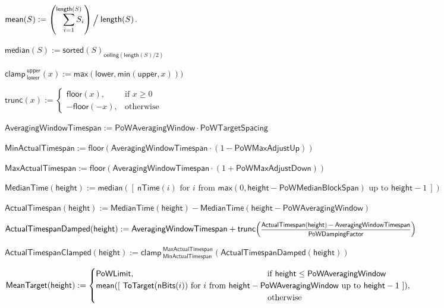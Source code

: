 \documentclass{article}
\newcommand{\hfrac}[2]{\scalebox{0.8}{$\genfrac{}{}{0.5pt}{0}{#1}{#2}$}}
\newcommand{\listcomp}[1]{[~{#1}~]}
\newcommand{\for}{\text{ for }}
\newcommand{\from}{\text{ from }}
\newcommand{\upto}{\text{ up to }}
\newcommand{\squash}{\!\!\!}
\newcommand{\caseif}{\squash\text{if }}
\newcommand{\caseotherwise}{\squash\text{otherwise}}
\newcommand{\sorted}{\mathsf{sorted}}
\newcommand{\length}{\mathsf{length}}
\newcommand{\mean}{\mathsf{mean}}
\newcommand{\median}{\mathsf{median}}
\newcommand{\clamp}[2]{\mathsf{clamp\,}_{#1}^{#2}}
\newcommand{\Lower}{\mathsf{lower}}
\newcommand{\Upper}{\mathsf{upper}}
\newcommand{\ToTarget}{\mathsf{ToTarget}}
\newcommand{\minimum}{\mathsf{min}}
\newcommand{\maximum}{\mathsf{max}}
\newcommand{\floor}[1]{\mathsf{floor}\!\left({#1}\right)}
\newcommand{\trunc}[1]{\mathsf{trunc}\!\left({#1}\right)}
\newcommand{\ceiling}[1]{\mathsf{ceiling}\left({#1}\right)}
\newcommand{\vsum}[2]{\smashoperator[r]{\sum_{#1}^{#2}}}
\newcommand{\mult}{\cdot}
\newcommand{\BlockHeight}{\mathsf{height}}
\newcommand{\PoWLimit}{\mathsf{PoWLimit}}
\newcommand{\PoWAveragingWindow}{\mathsf{PoWAveragingWindow}}
\newcommand{\PoWMedianBlockSpan}{\mathsf{PoWMedianBlockSpan}}
\newcommand{\PoWMaxAdjustDown}{\mathsf{PoWMaxAdjustDown}}
\newcommand{\PoWMaxAdjustUp}{\mathsf{PoWMaxAdjustUp}}
\newcommand{\PoWDampingFactor}{\mathsf{PoWDampingFactor}}
\newcommand{\PoWTargetSpacing}{\mathsf{PoWTargetSpacing}}
\newcommand{\MeanTarget}{\mathsf{MeanTarget}}
\newcommand{\MedianTime}{\mathsf{MedianTime}}
\newcommand{\AveragingWindowTimespan}{\mathsf{AveragingWindowTimespan}}
\newcommand{\MinActualTimespan}{\mathsf{MinActualTimespan}}
\newcommand{\MaxActualTimespan}{\mathsf{MaxActualTimespan}}
\newcommand{\ActualTimespan}{\mathsf{ActualTimespan}}
\newcommand{\ActualTimespanDamped}{\mathsf{ActualTimespanDamped}}
\newcommand{\ActualTimespanClamped}{\mathsf{ActualTimespanClamped}}
\newcommand{\nTime}{\mathsf{nTime}}
\newcommand{\nBits}{\mathsf{nBits}}
\begin{document}
\begin{formulae}
\hfuzz=10pt
  \item $\mean(S) := \left( \vsum{i=1}{\length(S)} S_i \right) \raisebox{-0.4ex}{\scalebox{1.4}{/\,}} \length(S)$.
  \item $\median(S) := \sorted(S)_{\ceiling{\length(S) / 2}}$
  \item $\clamp{\Lower}{\Upper}(x) := \maximum(\Lower, \minimum(\Upper, x)))$
  \item $\trunc{x} := \begin{cases}
          \floor{x},&\caseif x \geq 0 \\
          -\floor{-x},&\caseotherwise
        \end{cases}$

  \item $\AveragingWindowTimespan := \PoWAveragingWindow \mult \PoWTargetSpacing$
  \item $\MinActualTimespan := \floor{\AveragingWindowTimespan \mult (1 - \PoWMaxAdjustUp)}$
  \item $\MaxActualTimespan := \floor{\AveragingWindowTimespan \mult (1 + \PoWMaxAdjustDown)}$
  \item $\MedianTime(\BlockHeight) := \median(\listcomp{\nTime(i) \for i \from
                                              \maximum(0, \BlockHeight - \PoWMedianBlockSpan) \upto \BlockHeight - 1})$
  \item $\ActualTimespan(\BlockHeight) := \MedianTime(\BlockHeight) - \MedianTime(\BlockHeight - \PoWAveragingWindow)$
  \item $\ActualTimespanDamped(\BlockHeight) := \AveragingWindowTimespan + \trunc{\scalebox{0.98}{\hfrac{\ActualTimespan(\BlockHeight) - \AveragingWindowTimespan}{\PoWDampingFactor}}}$
  \item $\ActualTimespanClamped(\BlockHeight) := \clamp{\MinActualTimespan}{\MaxActualTimespan}(\ActualTimespanDamped(\BlockHeight))$
  \item $\MeanTarget(\BlockHeight) := \begin{cases}
          \PoWLimit, \hspace{16em}\text{if } \BlockHeight \leq \PoWAveragingWindow \\
          \mean(\listcomp{\ToTarget(\nBits(i)) \for i \from \BlockHeight - \PoWAveragingWindow \upto \BlockHeight - 1}),\\
                     \hspace{20.7em}\text{otherwise}
        \end{cases}$
\end{formulae}
\end{document}
